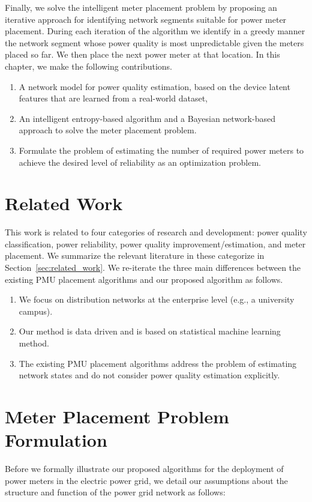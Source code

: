 Finally, we solve the intelligent meter placement problem by proposing an iterative approach for identifying network segments suitable for power meter placement. During each iteration of the algorithm we identify in a greedy manner the network segment whose power quality is most unpredictable given the meters placed so far. We then place the next power meter at that location. In this chapter, we make the following contributions. 
\begin{enumerate}
	\item A network model for power quality estimation, based on the device latent features that are learned from a real-world dataset, 
	\item An intelligent entropy-based algorithm and a Bayesian network-based approach to solve the meter placement problem.
	\item Formulate the problem of estimating the number of required power meters to achieve the desired level of reliability as an optimization problem.
\end{enumerate}

\section{Related Work}
This work is related to four categories of research and development: power quality classification, power reliability, power quality improvement/estimation, and meter placement. We summarize the relevant literature in these categorize in Section~\ref{sec:related_work}. We re-iterate the three main differences between the existing PMU placement algorithms and our proposed algorithm as follows.

\begin{enumerate}
\item We focus on distribution networks at the enterprise level (e.g., a university campus).
\item Our method is data driven and is based on statistical machine learning method.
\item The existing PMU placement algorithms address the problem of estimating network states and do not consider power quality estimation explicitly.
\end{enumerate}

\section{Meter Placement Problem Formulation}
Before we formally illustrate our proposed algorithms for the deployment of power meters in the electric power grid, we detail our assumptions about the structure and function of the power grid network as follows:

